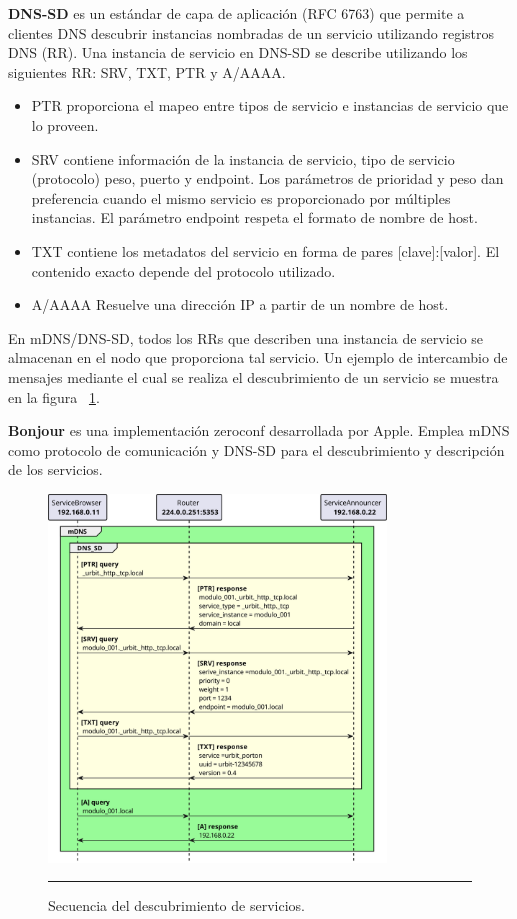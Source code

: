 \textbf{DNS-SD} es un estándar de capa de aplicación (RFC 6763) que permite a clientes DNS descubrir instancias nombradas de un servicio utilizando registros DNS (RR). Una instancia de servicio en DNS-SD se describe utilizando los siguientes RR: SRV, TXT, PTR y A/AAAA. 
\begin{itemize}
	\item PTR proporciona el mapeo entre tipos de servicio e instancias de servicio que lo proveen.
	\item SRV contiene información de la instancia de servicio, tipo de servicio (protocolo) peso, puerto y endpoint. Los parámetros de prioridad y peso dan preferencia cuando el mismo servicio es proporcionado por múltiples instancias. El parámetro endpoint respeta el formato de nombre de host.
	\item TXT contiene los metadatos del servicio en forma de pares [clave]:[valor]. El contenido exacto depende del protocolo utilizado.
	\item A/AAAA Resuelve una dirección IP a partir de un nombre de host.
\end{itemize}
En mDNS/DNS-SD, todos los RRs que describen una instancia de servicio se almacenan en el nodo que proporciona tal servicio. Un ejemplo de intercambio de mensajes mediante el cual se realiza el descubrimiento de un servicio se muestra en la figura ~\ref{fig:zeroconf_seq}.

\textbf{Bonjour} es una implementación zeroconf desarrollada por Apple. Emplea mDNS como protocolo de comunicación y DNS-SD para el descubrimiento y descripción de los servicios.

\begin{figure}[htbp]
	\centering
	\includegraphics[width=0.8\textwidth]{Figures/design/SEQ_mdns_dnssd_ink.png}
	\rule{35em}{1pt}
	\caption[mDNS y DNS-SD]{Secuencia del descubrimiento de servicios.}
	\label{fig:zeroconf_seq}
\end{figure}

